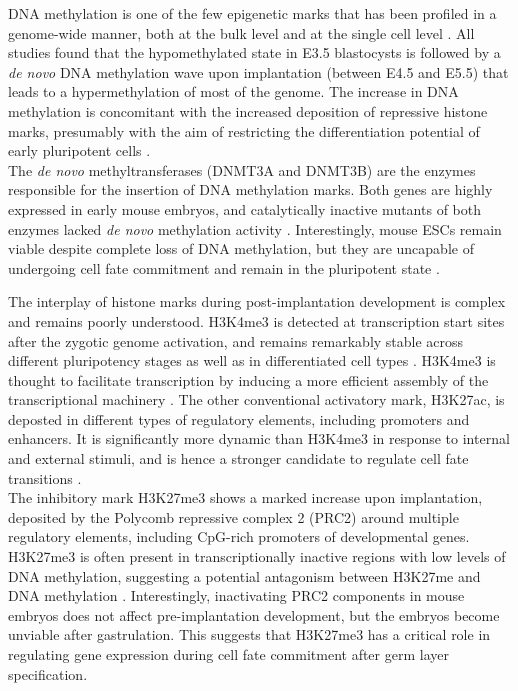 DNA methylation is one of the few epigenetic marks that has been profiled in a genome-wide manner, both at the bulk level and at the single cell level \cite{Auclair2014,Zhang2017,Dai2016,Rulands2018}. All studies found that the hypomethylated state in E3.5 blastocysts is followed by a \textit{de novo} DNA methylation wave upon implantation (between E4.5 and E5.5) that leads to a hypermethylation of most of the genome. The increase in DNA methylation is concomitant with the increased deposition of repressive histone marks, presumably with the aim of restricting the differentiation potential of early pluripotent cells \cite{Atlasi2017}.\\
The \textit{de novo} methyltransferases (DNMT3A and DNMT3B) are the enzymes responsible for the insertion of DNA methylation marks. Both genes are highly expressed in early mouse embryos, and catalytically inactive mutants of both enzymes lacked \textit{de novo} methylation activity \cite{Auclair2014,Okano1999}. Interestingly, mouse ESCs remain viable despite complete loss of DNA methylation, but they are uncapable of undergoing cell fate commitment and remain in the pluripotent state \cite{Tsumura2006}.

The interplay of histone marks during post-implantation development is complex and remains poorly understood. H3K4me3 is detected at transcription start sites after the zygotic genome activation, and remains remarkably stable across different pluripotency stages as well as in differentiated cell types \cite{Heintzman2009}. H3K4me3 is thought to facilitate transcription by inducing a more efficient assembly of the transcriptional machinery \cite{Atlasi2017,Vastenhouw2010}. The other conventional activatory mark, H3K27ac, is deposted in different types of regulatory elements, including promoters and enhancers. It is significantly more dynamic than H3K4me3 in response to internal and external stimuli, and is hence a stronger candidate to regulate cell fate transitions \cite{Atlasi2017,Rada-Iglesias2011}.\\
The inhibitory mark H3K27me3 shows a marked increase upon implantation, deposited by the Polycomb repressive complex 2 (PRC2) around multiple regulatory elements, including CpG-rich promoters of developmental genes. H3K27me3 is often present in transcriptionally inactive regions with low levels of DNA methylation, suggesting a potential antagonism between H3K27me and DNA methylation \cite{Brinkman2012,Atlasi2017}. Interestingly, inactivating PRC2 components in mouse embryos does not affect pre-implantation development, but the embryos become unviable after gastrulation\cite{Shan2017}. This suggests that H3K27me3 has a critical role in regulating gene expression during cell fate commitment after germ layer specification.

